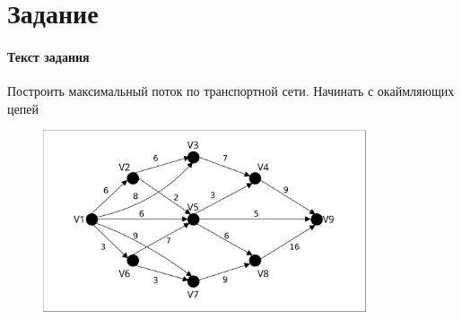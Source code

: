 \documentclass[a4paper, 12pt]{article}
\newcommand{\RNum}[1]{\uppercase\expandafter{\romannumeral #1\relax}}
\begin{document}
\section*{Задание \RNum{7}} 
\paragraph{Текст задания} Построить максимальный поток по транспортной сети. Начинать с окаймляющих цепей
\begin{figure}[h]
    \includegraphics[width=360px]{7_flow}
\end{figure}
\end{document}
